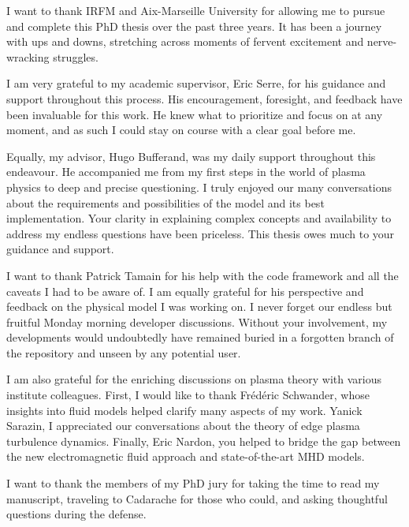 
I want to thank IRFM and Aix-Marseille University for allowing me to pursue and complete this PhD thesis over the past three years. It has been a journey with ups and downs, stretching across moments of fervent excitement and nerve-wracking struggles.

I am very grateful to my academic supervisor, Eric Serre, for his guidance and support throughout this process. His encouragement, foresight, and feedback have been invaluable for this work. He knew what to prioritize and focus on at any moment, and as such I could stay on course with a clear goal before me.

Equally, my advisor, Hugo Bufferand, was my daily support throughout this endeavour. He accompanied me from my first steps in the world of plasma physics to deep and precise questioning. I truly enjoyed our many conversations about the requirements and possibilities of the model and its best implementation. Your clarity in explaining complex concepts and availability to address my endless questions have been priceless. This thesis owes much to your guidance and support.

I want to thank Patrick Tamain for his help with the code framework and all the caveats I had to be aware of. I am equally grateful for his perspective and feedback on the physical model I was working on. I never forget our endless but fruitful Monday morning developer discussions. Without your involvement, my developments would undoubtedly have remained buried in a forgotten branch of the repository and unseen by any potential user. 

I am also grateful for the enriching discussions on plasma theory with various institute colleagues. First, I would like to thank Frédéric Schwander, whose insights into fluid models helped clarify many aspects of my work. Yanick Sarazin, I appreciated our conversations about the theory of edge plasma turbulence dynamics. Finally, Eric Nardon, you helped to bridge the gap between the new electromagnetic fluid approach and state-of-the-art MHD models.

I want to thank the members of my PhD jury for taking the time to read my manuscript, traveling to Cadarache for those who could, and asking thoughtful questions during the defense. 

